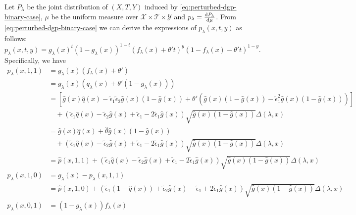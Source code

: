 \documentclass{article}
\def\eps{{\epsilon}}
\def\gT{{\mathcal{T}}}
\def\gX{{\mathcal{X}}}
\def\gY{{\mathcal{Y}}}
\newcommand{\dd}{\textup{d}}
\begin{document}
Let $P_{\lambda}$ be the joint distribution of $(X,T,Y)$ induced by \eqref{eq:perturbed-dgp-binary-case}, $\mu$ be the uniform measure over $\gX\times\gT\times\gY$ and $p_{\lambda}=\frac{\dd P_{\lambda}}{\dd\mu}$. From \eqref{eq:perturbed-dgp-binary-case} we can derive the expressions of $p_{\lambda}(x,t,y)$ as follows:
\begin{equation}
    \label{eq:binary-density-expression}
    p_{\lambda}(x,t,y) = g_{\lambda}(x)^t \left(1-g_{\lambda}(x)\right)^{1-t} \left(f_{\lambda}(x)+\theta't\right)^y\left(1-f_{\lambda}(x)-\theta't\right)^{1-y}.
\end{equation}
Specifically, we have
\begin{subequations}
    \label{eq:binary-density}
    \begin{align}
        p_{\lambda}(x,1,1) &= g_{\lambda}(x)\left(f_{\lambda}(x)+\theta'\right) \nonumber \\
        &= g_{\lambda}(x)\left(q_{\lambda}(x)+\theta'\left(1-g_{\lambda}(x)\right)\right) \nonumber \\
        &= \left[ \hat{g}(x)\hat{q}(x)-\tilde{\eps}_1\tilde{\eps}_2\hat{g}(x)\left(1-\hat{g}(x)\right) + \theta'\left(\hat{g}(x)\left(1-\hat{g}(x)\right) - \tilde{\eps}_1^2 \hat{g}(x)\left(1-\hat{g}(x)\right)\right) \right] \nonumber \\
        &\quad + \left(\tilde{\eps}_1\hat{q}(x)-\tilde{\eps}_2\hat{g}(x) + \tilde{\eps}_1-2\tilde{\eps}_1\hat{g}(x)\right) \sqrt{\hat{g}(x)(1-\hat{g}(x))} \Delta(\lambda,x) \nonumber \\
        &= \hat{g}(x)\hat{q}(x) + \hat{\theta}\hat{g}(x)\left(1-\hat{g}(x)\right) \\
        &\quad + \left(\tilde{\eps}_1\hat{q}(x)-\tilde{\eps}_2\hat{g}(x) + \tilde{\eps}_1-2\tilde{\eps}_1\hat{g}(x)\right) \sqrt{\hat{g}(x)(1-\hat{g}(x))} \Delta(\lambda,x) \nonumber \\
        &= \hat{p}(x,1,1)  + \left(\tilde{\eps}_1\hat{q}(x)-\tilde{\eps}_2\hat{g}(x) + \tilde{\eps}_1-2\tilde{\eps}_1\hat{g}(x)\right) \sqrt{\hat{g}(x)(1-\hat{g}(x))} \Delta(\lambda,x) \label{eq:binary-density-1-1} \\
        p_{\lambda}(x,1,0) &= g_{\lambda}(x) - p_{\lambda}(x,1,1) \nonumber \\
        &= \hat{p}(x,1,0) + \left(\tilde{\eps}_1(1-\hat{q}(x))+\tilde{\eps}_2\hat{g}(x) - \tilde{\eps}_1 + 2\tilde{\eps}_1\hat{g}(x)\right) \sqrt{\hat{g}(x)(1-\hat{g}(x))} \Delta(\lambda,x) \label{eq:binary-density-1-0} \\
        p_{\lambda}(x,0,1) &= (1-g_{\lambda}(x))f_{\lambda}(x) \nonumber \\

\end{align}
\end{subequations}
\end{document}
